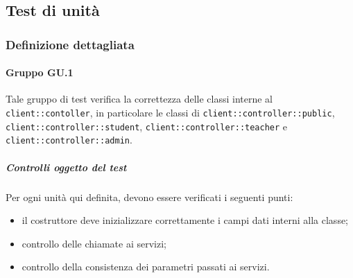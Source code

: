 \documentclass[12pt,a4paper]{article}
\begin{document}
	\subsection{Test di unità}\label{test_unita}
	\subsubsection{Definizione dettagliata}	
	\paragraph{Gruppo GU.1}
	Tale gruppo di test verifica la correttezza delle classi interne al  \texttt{client::contoller}, in particolare le classi di \texttt{client::controller::public}, \texttt{client::controller::student}, \texttt{client::controller::teacher} e \texttt{client::controller::admin}.
	
	\subparagraph{Controlli oggetto del test}
	Per ogni unità  qui definita, devono essere verificati i seguenti punti:
	
	\begin{itemize}
		\item il costruttore deve inizializzare correttamente i campi dati interni alla classe;
		\item controllo delle chiamate ai servizi;
		\item controllo della consistenza dei parametri passati ai servizi.
	\end{itemize}
	
	\newpage
	
\end{document}
